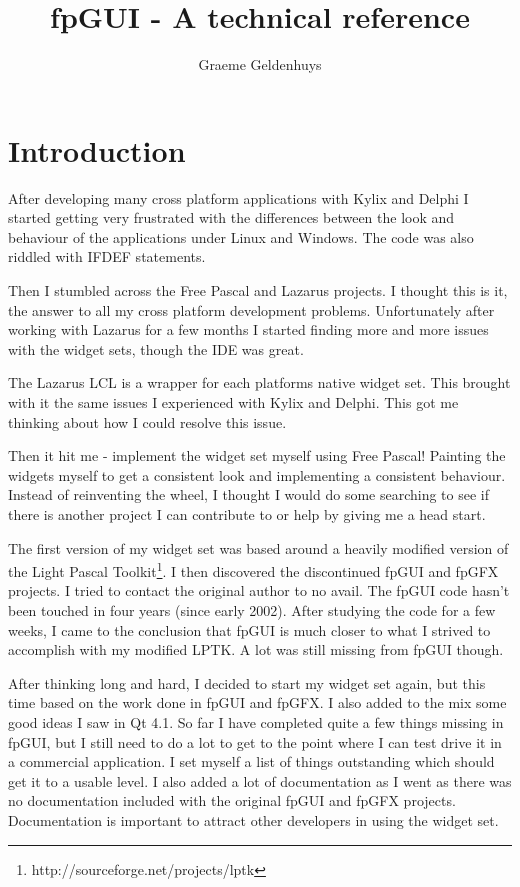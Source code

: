 \documentclass[a4paper,11pt]{report}
\author{Graeme Geldenhuys}
\title{fpGUI - A technical reference}
\begin{document}
\maketitle
\newpage

\tableofcontents
\newpage

\chapter{Introduction}
After developing many cross platform applications with Kylix and Delphi
I started getting very frustrated with the differences between the look and
behaviour of the applications under Linux and Windows.  The code was also
riddled with IFDEF statements.

Then I stumbled across the Free Pascal and Lazarus projects. I thought this 
is it, the answer to all my cross platform development problems. Unfortunately
after working with Lazarus for a few months I started finding more and more
issues with the widget sets, though the IDE was great.

The Lazarus LCL is a wrapper for each platforms native widget set. This 
brought with it the same issues I experienced with Kylix and Delphi. This got
me thinking about how I could resolve this issue.

Then it hit me - implement the widget set myself using Free Pascal! Painting
the widgets myself to get a consistent look and implementing a consistent
behaviour. Instead of reinventing the wheel, I thought I would do some searching
to see if there is another project I can contribute to or help by giving me
a head start.

The first version of my widget set was based around a heavily modified version
of the Light Pascal Toolkit\footnote{http://sourceforge.net/projects/lptk}. 
I then discovered the discontinued fpGUI and fpGFX projects. I tried 
to contact the original author to no avail. The fpGUI code hasn't been 
touched in four years (since early 2002). After studying the code for a 
few weeks, I came to the conclusion that fpGUI is much closer to what I strived 
to accomplish with my modified LPTK. A lot was still missing from fpGUI though.

After thinking long and hard, I decided to start my widget set again, but 
this time based on the work done in fpGUI and fpGFX. I also added to the 
mix some good ideas I saw in Qt 4.1. So far I have completed quite a few things 
missing in fpGUI, but I still need to do a lot to get to the point where I 
can test drive it in a commercial application. I set myself a list of 
things outstanding which should get it to a usable level. I also added a 
lot of documentation as I went as there was no documentation included with 
the original fpGUI and fpGFX projects. Documentation is important 
to attract other developers in using the widget set.
\end{document}
